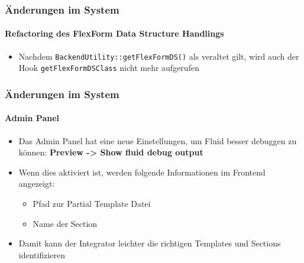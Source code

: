 \begin{frame}[fragile]
	\frametitle{Änderungen im System}
	\framesubtitle{Refactoring des FlexForm Data Structure Handlings}


	\begin{itemize}
		\item Nachdem \texttt{BackendUtility::getFlexFormDS()} als veraltet gilt, wird auch der Hook
			\texttt{getFlexFormDSClass} nicht mehr aufgerufen

	\end{itemize}

\end{frame}





\begin{frame}[fragile]
	\frametitle{Änderungen im System}
	\framesubtitle{Admin Panel}

	\begin{itemize}
		\item Das Admin Panel hat eine neue Einstellungen, um Fluid besser debuggen zu können:\newline
			\textbf{Preview -> Show fluid debug output}
		\item Wenn dies aktiviert ist, werden folgende Informationen im Frontend angezeigt:

			\begin{itemize}
				\item Pfad zur Partial Template Datei
				\item Name der Section
			\end{itemize}

		\item Damit kann der Integrator leichter die richtigen Templates und Sections identifizieren
	\end{itemize}

\end{frame}






